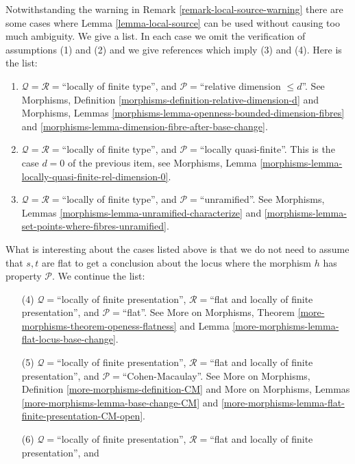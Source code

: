 \begin{remark}
\label{remark-local-source-apply}
Notwithstanding the warning in
Remark \ref{remark-local-source-warning}
there are some cases where
Lemma \ref{lemma-local-source}
can be used without causing too much ambiguity.
We give a list. In each case we omit the verification of
assumptions (1) and (2) and we give references which imply
(3) and (4). Here is the list:
\begin{enumerate}
\item $\mathcal{Q} = \mathcal{R} =$``locally of finite type'', and
$\mathcal{P} =$``relative dimension $\leq d$''.
See
Morphisms, Definition \ref{morphisms-definition-relative-dimension-d}
and
Morphisms, Lemmas \ref{morphisms-lemma-openness-bounded-dimension-fibres} and
\ref{morphisms-lemma-dimension-fibre-after-base-change}.
\item $\mathcal{Q} = \mathcal{R} =$``locally of finite type'', and
$\mathcal{P} =$``locally quasi-finite''.
This is the case $d = 0$ of the previous item, see
Morphisms, Lemma \ref{morphisms-lemma-locally-quasi-finite-rel-dimension-0}.
\item $\mathcal{Q} = \mathcal{R} =$``locally of finite type'', and
$\mathcal{P} =$``unramified''.
See
Morphisms, Lemmas \ref{morphisms-lemma-unramified-characterize} and
\ref{morphisms-lemma-set-points-where-fibres-unramified}.
\end{enumerate}
What is interesting about the cases listed above is that we do not
need to assume that $s, t$ are flat to get a conclusion about the locus
where the morphism $h$ has property $\mathcal{P}$. We continue the
list:
\begin{enumerate}
\item[(4)] $\mathcal{Q} =$``locally of finite presentation'',
$\mathcal{R} =$``flat and locally of finite presentation'', and
$\mathcal{P} =$``flat''. See
More on Morphisms, Theorem
\ref{more-morphisms-theorem-openess-flatness} and
Lemma \ref{more-morphisms-lemma-flat-locus-base-change}.
\item[(5)] $\mathcal{Q} =$``locally of finite presentation'',
$\mathcal{R} =$``flat and locally of finite presentation'', and
$\mathcal{P}=$``Cohen-Macaulay''. See
More on Morphisms, Definition \ref{more-morphisms-definition-CM}
and
More on Morphisms, Lemmas \ref{more-morphisms-lemma-base-change-CM} and
\ref{more-morphisms-lemma-flat-finite-presentation-CM-open}.
\item[(6)] $\mathcal{Q} =$``locally of finite presentation'',
$\mathcal{R} =$``flat and locally of finite presentation'', and

\end{enumerate}
\end{remark}
